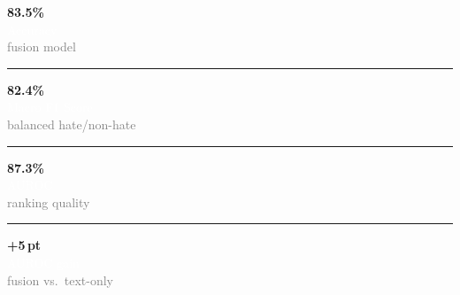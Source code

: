 \noindent\colorbox{darkbg}{%
  \begin{minipage}[c]{\dimexpr\textwidth\relax}%
    \vspace{5mm}
    \centering
    \begin{minipage}[c]{0.23\textwidth}\centering
      \textcolor{epflred}{\huge\bfseries 83.5\%}\\[2mm]
      \textcolor{white}{\large Accuracy}\\[1mm]
      \textcolor{gray}{\normalsize fusion model}
    \end{minipage}%
    \hspace{0.01\textwidth}%
    \textcolor{gray!40}{\rule{0.5pt}{20mm}}%
    \hspace{0.01\textwidth}%
    \begin{minipage}[c]{0.23\textwidth}\centering
      \textcolor{epflred}{\huge\bfseries 82.4\%}\\[2mm]
      \textcolor{white}{\large Macro F1 Score}\\[1mm]
      \textcolor{gray}{\normalsize balanced hate/non-hate}
    \end{minipage}%
    \hspace{0.01\textwidth}%
    \textcolor{gray!40}{\rule{0.5pt}{20mm}}%
    \hspace{0.01\textwidth}%
    \begin{minipage}[c]{0.23\textwidth}\centering
      \textcolor{epflred}{\huge\bfseries 87.3\%}\\[2mm]
      \textcolor{white}{\large AUROC}\\[1mm]
      \textcolor{gray}{\normalsize ranking quality}
    \end{minipage}%
    \hspace{0.01\textwidth}%
    \textcolor{gray!40}{\rule{0.5pt}{20mm}}%
    \hspace{0.01\textwidth}%
    \begin{minipage}[c]{0.23\textwidth}\centering
      \textcolor{epflred}{\huge\bfseries +5\,pt}\\[2mm]
      \textcolor{white}{\large AUROC gain}\\[1mm]
      \textcolor{gray}{\normalsize fusion vs.\ text-only}
    \end{minipage}
    \vspace{5mm}
  \end{minipage}%
}

